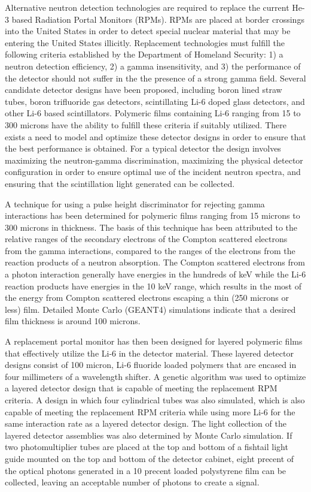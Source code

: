 Alternative neutron detection technologies are required to replace the current He-3 based Radiation Portal Monitors (RPMs).
RPMs are placed at border crossings into the United States in order to detect special nuclear material that may be entering the United States illicitly.
Replacement technologies must fulfill the following criteria established by the Department of Homeland Security: 1) a neutron detection efficiency, 2) a gamma insensitivity, and 3) the performance of the detector should not suffer in the the presence of a strong gamma field.
Several candidate detector designs have been proposed, including boron lined straw tubes, boron trifluoride gas detectors, scintillating Li-6 doped glass detectors, and other Li-6 based scintillators.
Polymeric films containing Li-6 ranging from 15 to 300 microns have the ability to fulfill these criteria if suitably utilized.
There exists a need to model and optimize these detector designs in order to ensure that the best performance is obtained. 
For a typical detector the design involves maximizing the neutron-gamma discrimination, maximizing the physical detector configuration in order to ensure optimal use of the incident neutron spectra, and ensuring that the scintillation light generated can be collected.

A technique for using a pulse height discriminator for rejecting gamma interactions has been determined for polymeric films  ranging from 15 microns to 300 microns in thickness.
The basis of this technique has been attributed to the relative ranges of the secondary electrons of the Compton scattered electrons from the gamma interactions, compared to the ranges of the electrons from the reaction products of a neutron absorption.
The Compton scattered electrons from a photon interaction generally have energies in the hundreds of keV while the Li-6 reaction products have energies in the 10 keV range, which results in the most of the energy from Compton scattered electrons escaping a thin (250 microns or less) film.
Detailed Monte Carlo (GEANT4) simulations indicate that a desired film thickness is around 100 microns.

A replacement portal monitor has then been designed for layered polymeric films that effectively utilize the Li-6 in the detector material.
These layered detector designs consist of 100 micron, Li-6 fluoride loaded polymers that are encased in four millimeters of a wavelength shifter.
A genetic algorithm was used to optimize a layered detector design that is capable of meeting the replacement RPM criteria.
A design in which four cylindrical tubes was also simulated, which is also capable of meeting the replacement RPM criteria while using more Li-6 for the same interaction rate as a layered detector design.
The light collection of the layered detector assemblies was also determined by Monte Carlo simulation.
If two photomultiplier tubes are placed at the top and bottom of a fishtail light guide mounted on the top and bottom of the detector cabinet, eight precent of the optical photons generated in a 10 precent loaded polystyrene film can be collected, leaving an acceptable number of photons to create a signal.
